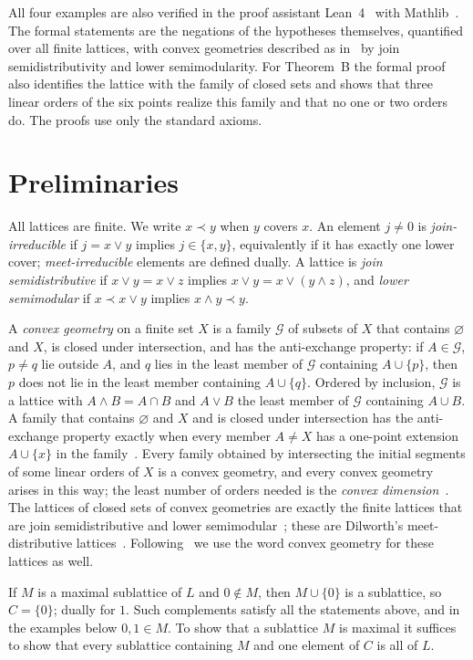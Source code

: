 \documentclass[11pt]{amsart}
\theoremstyle{definition}
\theoremstyle{remark}
\numberwithin{equation}{section}
\begin{document}
All four examples are also verified in the proof assistant Lean~4~\cite{MU} with Mathlib~\cite{Mathlib}. The formal statements are the negations of the hypotheses themselves, quantified over all finite lattices, with convex geometries described as in~\cite{AMSZ} by join semidistributivity and lower semimodularity. For Theorem~B the formal proof also identifies the lattice with the family of closed sets and shows that three linear orders of the six points realize this family and that no one or two orders do. The proofs use only the standard axioms.

\section{Preliminaries}

All lattices are finite. We write $x\prec y$ when $y$ covers $x$. An element $j\ne0$ is \emph{join-irreducible} if $j=x\vee y$ implies $j\in\{x,y\}$, equivalently if it has exactly one lower cover; \emph{meet-irreducible} elements are defined dually. A lattice is \emph{join semidistributive} if $x\vee y=x\vee z$ implies $x\vee y=x\vee(y\wedge z)$, and \emph{lower semimodular} if $x\prec x\vee y$ implies $x\wedge y\prec y$.

A \emph{convex geometry} on a finite set $X$ is a family $\mathcal G$ of subsets of $X$ that contains $\varnothing$ and $X$, is closed under intersection, and has the anti-exchange property: if $A\in\mathcal G$, $p\ne q$ lie outside $A$, and $q$ lies in the least member of $\mathcal G$ containing $A\cup\{p\}$, then $p$ does not lie in the least member containing $A\cup\{q\}$. Ordered by inclusion, $\mathcal G$ is a lattice with $A\wedge B=A\cap B$ and $A\vee B$ the least member of $\mathcal G$ containing $A\cup B$. A family that contains $\varnothing$ and $X$ and is closed under intersection has the anti-exchange property exactly when every member $A\ne X$ has a one-point extension $A\cup\{x\}$ in the family~\cite{EJ}. Every family obtained by intersecting the initial segments of some linear orders of $X$ is a convex geometry, and every convex geometry arises in this way; the least number of orders needed is the \emph{convex dimension}~\cite{EJ}. The lattices of closed sets of convex geometries are exactly the finite lattices that are join semidistributive and lower semimodular~\cite{AN}; these are Dilworth's meet-distributive lattices~\cite{Di}. Following~\cite{AMSZ} we use the word convex geometry for these lattices as well.

If $M$ is a maximal sublattice of $L$ and $0\notin M$, then $M\cup\{0\}$ is a sublattice, so $C=\{0\}$; dually for $1$. Such complements satisfy all the statements above, and in the examples below $0,1\in M$. To show that a sublattice $M$ is maximal it suffices to show that every sublattice containing $M$ and one element of $C$ is all of $L$.
\end{document}
